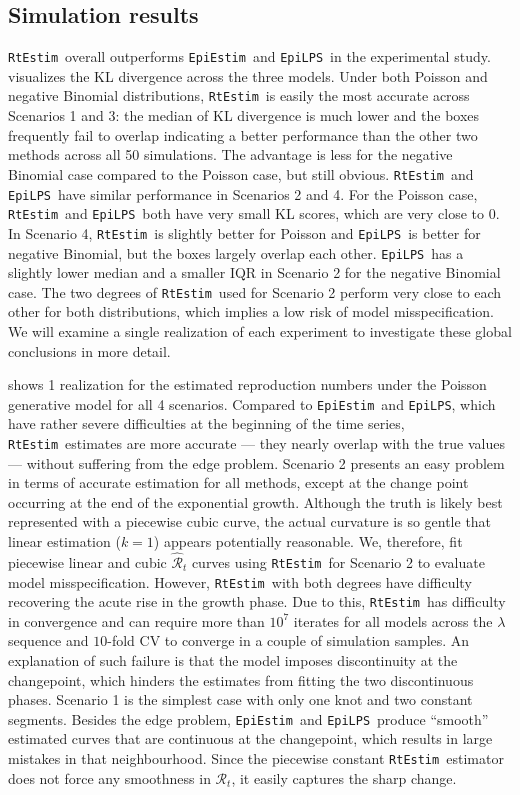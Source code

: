 \documentclass[10pt,letterpaper]{article}
\def\RtEstim{\texttt{RtEstim}}
\def\EpiEstim{\texttt{EpiEstim}}
\def\EpiLPS{\texttt{EpiLPS}}
\def\calR{\mathcal{R}}
\begin{document}
\subsection{Simulation results}

\RtEstim\ overall outperforms \EpiEstim\ and \EpiLPS\ in the experimental study.
 visualizes the KL divergence across the three models. Under
both Poisson and negative Binomial distributions, \RtEstim\ is easily the most
accurate across Scenarios 1 and 3: the median of KL divergence is much lower
and the boxes frequently fail to overlap indicating a better performance than
the other two methods across all 50 simulations. 
The advantage is less for the
negative Binomial case compared to the Poisson case, but still obvious. 
\RtEstim\ and \EpiLPS\ have similar performance in Scenarios 2 and 4. 
For the Poisson case, \RtEstim\ and \EpiLPS\ both have very small KL scores, which 
are very close to 0. In Scenario 4, \RtEstim\ is slightly better for Poisson and 
\EpiLPS\ is better for negative Binomial, but the boxes largely overlap each other. 
\EpiLPS\ has a slightly lower median and a smaller IQR in Scenario 2 for the 
negative Binomial case. The two degrees of \RtEstim\ used for Scenario 2 perform 
very close to each other for both distributions, which implies a low risk of 
model misspecification. We will examine a single realization of each experiment 
to investigate these global conclusions in more detail.


 shows 1 realization for the estimated reproduction
numbers under the Poisson generative model for all 4 scenarios. Compared to
\EpiEstim\ and \EpiLPS, which have rather severe difficulties at the beginning
of the time series, \RtEstim\ estimates are more accurate --- they nearly overlap
with the true values --- without suffering from the edge problem. 
Scenario 2 presents an easy problem in terms of accurate estimation for all methods, 
except at the change point occurring at the end of the exponential growth. 
Although the truth is likely best represented with a piecewise cubic curve, the actual
curvature is so gentle that linear estimation ($k=1$) appears potentially
reasonable. We, therefore, fit piecewise linear and cubic $\hat{\calR}_t$ curves
using \RtEstim\ for Scenario 2 to evaluate model misspecification. 
However, \RtEstim\ with both degrees have difficulty recovering the acute rise 
in the growth phase. Due to this, \RtEstim\ has difficulty in convergence and 
can require more than $10^7$ iterates for all models across the $\lambda$ sequence 
and $10$-fold CV to converge in a couple of simulation samples. 
An explanation of such failure is that the model imposes discontinuity at the
changepoint, which hinders the estimates from fitting the two discontinuous
phases. Scenario 1 is the simplest case with only one knot and two constant
segments. Besides the edge problem, \EpiEstim\ and \EpiLPS\ produce ``smooth''
estimated curves that are continuous at the changepoint, which results in
large mistakes in that neighbourhood. Since the piecewise constant 
\RtEstim\ estimator does not force any smoothness in $\calR_t$, it easily 
captures the sharp change. 
\end{document}
